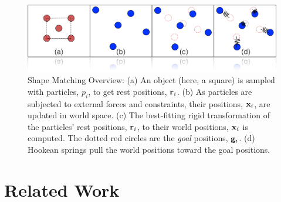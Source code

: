 \documentclass[review]{acmsiggraph}
\begin{document}
\begin{figure}
\includegraphics[width=\linewidth]{Figures/shapematching.png}
\caption{Shape Matching Overview: (a) An object (here, a square) is sampled with particles, $p_i$, to get rest positions, $\mathit{\mathbf{r}}_i$.  
(b) As particles are subjected to external forces and constraints, their positions, $\mathit{\mathbf{x}}_i$, are updated in world space.  
(c)  The best-fitting rigid transformation of the particles' rest positions, $\mathit{\mathbf{r}}_i$, 
to their world positions, $\mathit{\mathbf{x}}_i$ is computed.  The dotted red circles are the {\em goal} positions, $\mathit{\mathbf{g}}_i$.  
(d) Hookean springs pull the world positions toward the goal positions.}
\label{fig:shapematching}
\end{figure}

\section{Related Work}


\end{document}
